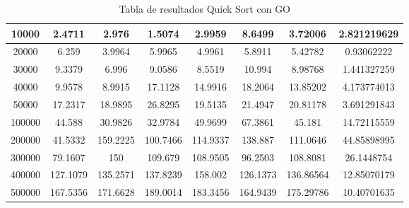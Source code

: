 \documentclass{article}
\begin{document}
\begin{table}[]
\begin{tabular}{|c|c|c|c|c|c|c|c| }
                10000	&2.4711	&2.976	&1.5074	&2.9959	&8.6499	&3.72006	&2.821219629\\ \hline
                20000	&6.259	&3.9964	&5.9965	&4.9961	&5.8911	&5.42782	&0.93062222\\ \hline
                30000	&9.3379	&6.996	&9.0586	&8.5519	&10.994	&8.98768	&1.441327259\\ \hline
                40000	&9.9578	&8.9915	&17.1128	&14.9916	&18.2064	&13.85202	&4.173774013\\ \hline
                50000	&17.2317	&18.9895	&26.8295	&19.5135	&21.4947	&20.81178	&3.691291843\\ \hline
                100000	&44.588	&30.9826	&32.9784	&49.9699	&67.3861	&45.181	&14.72115559\\ \hline
                200000	&41.5332	     &159.2225	&100.7466	&114.9337	&138.887	     &111.0646	&44.85898995\\ \hline
                300000	&79.1607	     &150	    &109.679	    &108.9505	&96.2503	     &108.8081	&26.1448754\\ \hline
                400000	&127.1079	&135.2571	&137.8239	&158.002	      &126.1373	&136.86564	&12.85070179\\ \hline
                500000	&167.5356	&171.6628	&189.0014	&183.3456	&164.9439	&175.29786	&10.40701635\\ \hline
        \end{tabular}
           \caption{Tabla de resultados Quick Sort con GO}
        \label{tab:quickSortC}
    \end{table}
\end{document}
